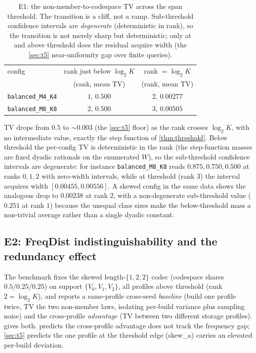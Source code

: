 \documentclass[11pt]{article}
\theoremstyle{definition}
\theoremstyle{plain}
\theoremstyle{remark}
\newcommand{\W}{W}                          %
\begin{document}
\begin{table}[t]
  \centering
  \caption{E1: the non-member-to-codespace TV across the span threshold. The transition
  is a cliff, not a ramp. Sub-threshold confidence intervals are \emph{degenerate}
  (deterministic in rank), so the transition is not merely sharp but deterministic; only
  at and above threshold does the residual acquire width (the \cref{sec:t5} near-uniformity
  gap over finite queries).}
  \label{tab:e1}
  \begin{tabular}{lcc}
    \toprule
    config & rank just below $\log_2 K$ & rank $= \log_2 K$ \\
           & (rank, mean TV) & (rank, mean TV) \\
    \midrule
    \texttt{balanced\_M4\_K4} & $1$, \quad $0.500$ & $2$, \quad $0.00277$ \\
    \texttt{balanced\_M8\_K8} & $2$, \quad $0.500$ & $3$, \quad $0.00505$ \\
    \bottomrule
  \end{tabular}
\end{table}

TV drops from $0.5$ to $\sim 0.003$ (the \cref{sec:t5} floor) as the rank crosses
$\log_2 K$, with no intermediate value, exactly the step function of \cref{thm:threshold}.
Below threshold the per-config TV is deterministic in the rank (the step-function masses
are fixed dyadic rationals on the enumerated $\W$), so the sub-threshold confidence
intervals are degenerate: for instance \texttt{balanced\_M8\_K8} reads $0.875, 0.750,
0.500$ at ranks $0, 1, 2$ with zero-width intervals, while at threshold (rank $3$) the
interval acquires width $[0.00455, 0.00556]$. A skewed config in the same data shows the
analogous drop to $0.00238$ at rank $2$, with a non-degenerate sub-threshold value
($0.251$ at rank $1$) because the unequal class sizes make the below-threshold mass a
non-trivial average rather than a single dyadic constant.

\subsection{E2: FreqDist indistinguishability and the redundancy effect}

The benchmark fixes the skewed length-$\{1,2,2\}$ codec (codespace shares
$0.5/0.25/0.25$) on support $\{V_0, V_1, V_2\}$, all profiles above threshold (rank
$2 = \log_2 K$), and reports a same-profile cross-seed \emph{baseline} (build one profile
twice, TV the two non-member laws, isolating per-build variance plus sampling noise) and
the cross-profile \emph{advantage} (TV between two different storage profiles).
 gives both.  predicts the cross-profile advantage does
not track the frequency gap; \cref{sec:t5} predicts the one profile at the threshold edge
(skew\_a) carries an elevated per-build deviation.
\end{document}
